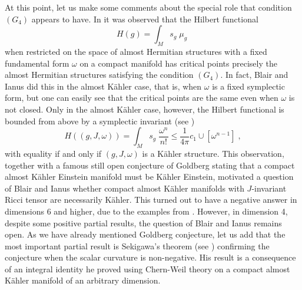 \documentclass{amsart}
\begin{document}
At this point, let us make some comments about the special role that condition $(G_4)$ appears to have. In \cite{BI} it was observed that the Hilbert functional
$$H(g) = \int_M s_g \; \mu_g \; $$
when restricted on the space of almost Hermitian structures with a fixed fundamental form $\omega$ on a compact manifold has critical points precisely the almost Hermitian structures satisfying the condition $(G_4)$. In fact, Blair and Ianus did this in the almost K\"ahler case, that is, when $\omega$ is a fixed symplectic form, but one can easily see that the critical points are the same even when $\omega$ is not closed. Only in the almost K\"ahler case, however, the Hilbert functional is bounded from above by a symplectic invariant (see \cite{Bl})
$$H((g, J, \omega)) = \int_M s_g \; \frac{\omega^n}{n!} \leq \frac{1}{4\pi} c_1\cup [\omega^{n-1}] \; ,$$
with equality if and only if $(g, J, \omega)$ is a K\"ahler structure. This observation, together with a famous still open conjecture of Goldberg \cite{Go} stating that a compact almost K\"ahler Einstein manifold must be K\"ahler Einstein, motivated a question of Blair and Ianus whether compact almost K\"ahler manifolds with $J$-invariant Ricci tensor are necessarily K\"ahler. This turned out to have a negative answer in dimensions 6 and higher, due to the examples from \cite{DM}. However, in dimension 4, despite some positive partial results, the question of Blair and Ianus remains open. As we have already mentioned Goldberg conjecture, let us add that the most important partial result is Sekigawa's theorem (see \cite{sekigawa}) confirming the conjecture when the scalar curvature is non-negative. His result is a consequence of an integral identity he proved using Chern-Weil theory on a compact almost K\"ahler manifold of an arbitrary dimension.
\end{document}
